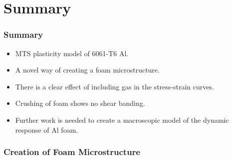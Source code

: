 \documentclass{beamer}
\begin{document}
  \section*{Summary}

    \begin{frame}
      \frametitle<presentation>{Summary}
      \begin{itemize}
      \item
        MTS plasticity model of 6061-T6 Al.
      \item
        A novel way of creating a foam microstructure.
      \item 
        There is a clear effect of including gas in the
        stress-strain curves.
      \item
        Crushing of foam shows no shear banding. 
      \item
        Further work is needed to create a macroscopic 
        model of the dynamic response of Al foam.
      \end{itemize}
    \end{frame}

    \begin{frame}
      \frametitle{Creation of Foam Microstructure}
      \begin{center}
      \end{center}
    \end{frame}
\end{document}
